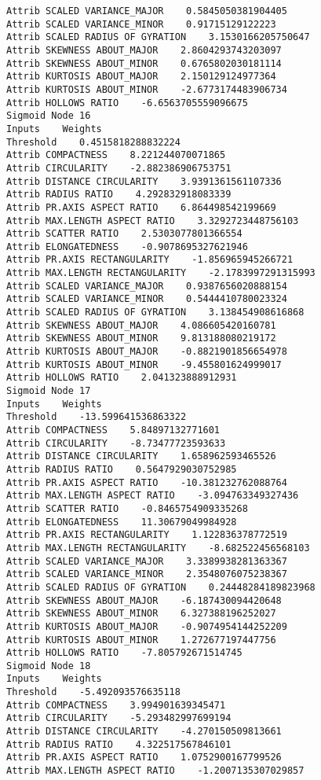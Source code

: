 \documentclass[
	article,			%
	11pt,				%
	oneside,			%
	a4paper,			%
	english,			%
	brazil,				%
	sumario=tradicional
	]{abntex2}
\begin{document}
\begin{lstlisting}
Attrib SCALED VARIANCE_MAJOR    0.5845050381904405
Attrib SCALED VARIANCE_MINOR    0.91715129122223
Attrib SCALED RADIUS OF GYRATION    3.1530166205750647
Attrib SKEWNESS ABOUT_MAJOR    2.8604293743203097
Attrib SKEWNESS ABOUT_MINOR    0.6765802030181114
Attrib KURTOSIS ABOUT_MAJOR    2.150129124977364
Attrib KURTOSIS ABOUT_MINOR    -2.6773174483906734
Attrib HOLLOWS RATIO    -6.6563705559096675
Sigmoid Node 16
Inputs    Weights
Threshold    0.4515818288832224
Attrib COMPACTNESS    8.221244070071865
Attrib CIRCULARITY    -2.882386906753751
Attrib DISTANCE CIRCULARITY    3.9391361561107336
Attrib RADIUS RATIO    4.292832918083339
Attrib PR.AXIS ASPECT RATIO    6.864498542199669
Attrib MAX.LENGTH ASPECT RATIO    3.3292723448756103
Attrib SCATTER RATIO    2.5303077801366554
Attrib ELONGATEDNESS    -0.9078695327621946
Attrib PR.AXIS RECTANGULARITY    -1.856965945266721
Attrib MAX.LENGTH RECTANGULARITY    -2.1783997291315993
Attrib SCALED VARIANCE_MAJOR    0.9387656020888154
Attrib SCALED VARIANCE_MINOR    0.5444410780023324
Attrib SCALED RADIUS OF GYRATION    3.138454908616868
Attrib SKEWNESS ABOUT_MAJOR    4.086605420160781
Attrib SKEWNESS ABOUT_MINOR    9.813188080219172
Attrib KURTOSIS ABOUT_MAJOR    -0.8821901856654978
Attrib KURTOSIS ABOUT_MINOR    -9.455801624999017
Attrib HOLLOWS RATIO    2.041323888912931
Sigmoid Node 17
Inputs    Weights
Threshold    -13.599641536863322
Attrib COMPACTNESS    5.84897132771601
Attrib CIRCULARITY    -8.73477723593633
Attrib DISTANCE CIRCULARITY    1.658962593465526
Attrib RADIUS RATIO    0.5647929030752985
Attrib PR.AXIS ASPECT RATIO    -10.381232762088764
Attrib MAX.LENGTH ASPECT RATIO    -3.094763349327436
Attrib SCATTER RATIO    -0.8465754909335268
Attrib ELONGATEDNESS    11.30679049984928
Attrib PR.AXIS RECTANGULARITY    1.122836378772519
Attrib MAX.LENGTH RECTANGULARITY    -8.682522456568103
Attrib SCALED VARIANCE_MAJOR    3.3389938281363367
Attrib SCALED VARIANCE_MINOR    2.3548076075238367
Attrib SCALED RADIUS OF GYRATION    0.24448284189823968
Attrib SKEWNESS ABOUT_MAJOR    -6.187430094420648
Attrib SKEWNESS ABOUT_MINOR    6.327388196252027
Attrib KURTOSIS ABOUT_MAJOR    -0.9074954144252209
Attrib KURTOSIS ABOUT_MINOR    1.272677197447756
Attrib HOLLOWS RATIO    -7.805792671514745
Sigmoid Node 18
Inputs    Weights
Threshold    -5.492093576635118
Attrib COMPACTNESS    3.994901639345471
Attrib CIRCULARITY    -5.293482997699194
Attrib DISTANCE CIRCULARITY    -4.270150509813661
Attrib RADIUS RATIO    4.322517567846101
Attrib PR.AXIS ASPECT RATIO    1.0752900167799526
Attrib MAX.LENGTH ASPECT RATIO    -1.2007135307029857

\end{lstlisting}
\end{document}
